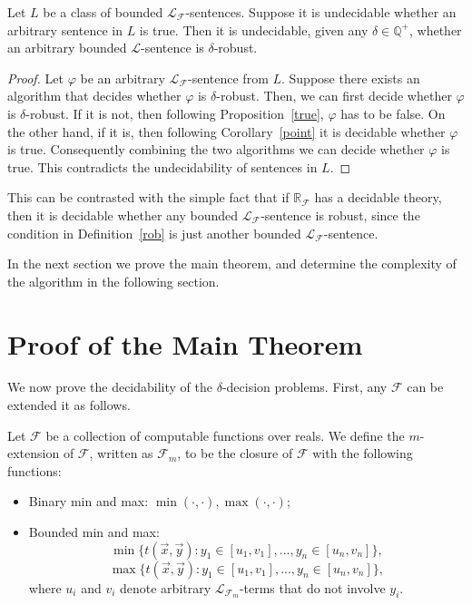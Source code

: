 \documentclass[prodmode]{acmsmall} %
\begin{document}
\begin{corollary}
Let $L$ be a class of bounded $\mathcal{L}_{\mathcal{F}}$-sentences. Suppose it is undecidable whether an arbitrary sentence in $L$ is true. Then it is undecidable, given any $\delta\in \mathbb{Q}^+$, whether an arbitrary bounded $\mathcal{L}$-sentence is $\delta$-robust. 
\end{corollary}
\begin{proof}
Let $\varphi$ be an arbitrary $\mathcal{L}_{\mathcal{F}}$-sentence from $L$. Suppose there exists an algorithm that decides whether $\varphi$ is $\delta$-robust. Then, we can first decide whether $\varphi$ is $\delta$-robust. If it is not, then following Proposition~\ref{true}, $\varphi$ has to be false. On the other hand, if it is, then following Corollary~\ref{point} it is decidable whether $\varphi$ is true. Consequently combining the two algorithms we can decide whether $\varphi$ is true. This contradicts the undecidability of sentences in $L$.
\end{proof}

This can be contrasted with the simple fact that if $\mathbb{R}_{\mathcal{F}}$ has a decidable theory, then it is decidable whether any bounded $\mathcal{L}_{\mathcal{F}}$-sentence is robust, since the condition in Definition~\ref{rob} is just another bounded $\mathcal{L}_{\mathcal{F}}$-sentence. 

In the next section we prove the main theorem, and determine the complexity of the algorithm in the following section. 

\section{Proof of the Main Theorem}\label{mainproof}

We now prove the decidability of the $\delta$-decision problems. First, any $\mathcal{F}$ can be extended it as follows. 
\begin{definition}[$m$-Extension] Let $\mathcal{F}$ be a collection of computable functions over reals. We define the $m$-extension of $\mathcal{F}$, written as $\mathcal{F}_m$, to be the closure of $\mathcal{F}$ with the following functions:
\begin{itemize}
\item Binary min and max: $\min(\cdot,\cdot), \max(\cdot,\cdot)$; 
\item Bounded min and max: 
$$\min\{t(\vec x, \vec y): y_1\in [u_1,v_1],...,y_n\in [u_n, v_n]\},$$
$$\max\{t(\vec x, \vec y): y_1\in [u_1,v_1],...,y_n\in [u_n, v_n]\},$$ 
where $u_i$ and $v_i$ denote arbitrary $\mathcal{L}_{\mathcal{F}_m}$-terms that do not involve $y_i$. 
\end{itemize}
\end{definition}
\end{document}
